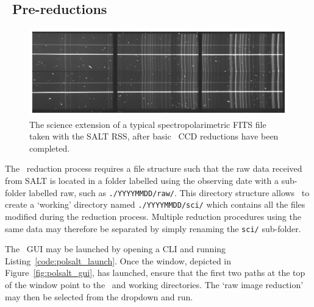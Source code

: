 \subsection{\polsalt\ Pre-reductions}\label{subsec:reduc_pre}

\begin{figure}[t]
    \centering
    \includegraphics[width = 1.0\textwidth]{figures/3_pre_wav_cal.pdf}
    \caption{The science extension of a typical spectropolarimetric \acs{FITS} file taken with the \gls{SALT} \gls{RSS}, after basic \polsalt\ \gls{CCD} reductions have been completed.}
    \label{fig:polsalt_pre_wav_cal}
\end{figure}

The \polsalt\ reduction process requires a file structure such that the raw data received from \gls{SALT} is located in a folder labelled using the observing date with a sub-folder labelled raw, such as \texttt{./YYYYMMDD/raw/}. This directory structure allows \polsalt\ to create a `working' directory named \texttt{./YYYYMMDD/sci/} which contains all the files modified during the reduction process. Multiple reduction procedures using the same data may therefore be separated by simply renaming the \texttt{sci/} sub-folder.

The \polsalt\ \gls{GUI} may be launched by opening a \gls{CLI} and running Listing~\ref{code:polsalt_launch}. Once the window, depicted in Figure~\ref{fig:polsalt_gui}, has launched, ensure that the first two paths at the top of the window point to the \polsalt\ and working directories. The `raw image reduction' may then be selected from the dropdown and run.


